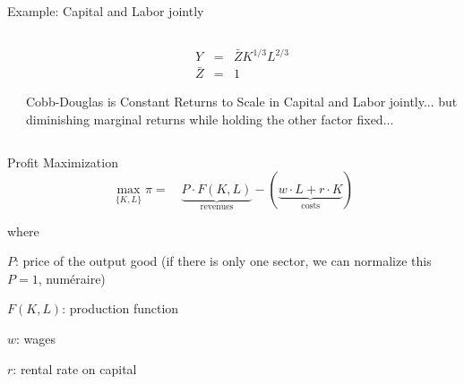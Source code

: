 \documentclass[notes,11pt, aspectratio=169, xcolor=table]{beamer}
\newenvironment{wideitemize}{\itemize\addtolength{\itemsep}{10pt}}{\enditemize}
\begin{document}
\begin{frame}{Example: Capital and Labor jointly}

\begin{columns}[T] %
\begin{column}{.8\textwidth}
\end{column}%
\hfill%
\begin{column}{.2\textwidth}
\begin{eqnarray*}
    Y &=& \bar{Z} K^{1/3} L^{2/3} \\
    \bar{Z} &=& 1
\end{eqnarray*}

Cobb-Douglas is Constant Returns to Scale in Capital and Labor jointly... but diminishing marginal returns while holding the other factor fixed...
\end{column}%
\end{columns}


\end{frame}

\begin{frame}{Profit Maximization}
  \begin{equation*}
    \max_{\{K,L\}} \pi  = \quad \underbrace{P \cdot F(K,L)}_{\text{revenues}} - \left( \underbrace{w \cdot L + r \cdot K}_{\text{costs}} \right)
  \end{equation*}

  \noindent where 
  \begin{wideitemize}
    \item $P$: price of the output good (if there is only one sector, we can normalize this $P=1$, num\'eraire)
    \item $F(K,L)$: production function
    \item $w$: wages
    \item $r$: rental rate on capital
  \end{wideitemize}
  
\end{frame}
\end{document}

